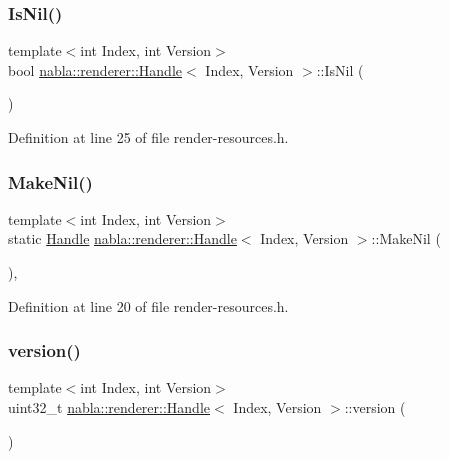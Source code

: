 \subsubsection{\texorpdfstring{IsNil()}{IsNil()}}
{\footnotesize\ttfamily template$<$int Index, int Version$>$ \\
bool \mbox{\hyperlink{classnabla_1_1renderer_1_1_handle}{nabla\+::renderer\+::\+Handle}}$<$ Index, Version $>$\+::Is\+Nil (\begin{DoxyParamCaption}{ }\end{DoxyParamCaption})\hspace{0.3cm}{\ttfamily [inline]}}



Definition at line 25 of file render-\/resources.\+h.

\mbox{\label{classnabla_1_1renderer_1_1_handle_a431d40c431625c3001b95485bcfafc97}} 
\subsubsection{\texorpdfstring{MakeNil()}{MakeNil()}}
{\footnotesize\ttfamily template$<$int Index, int Version$>$ \\
static \mbox{\hyperlink{classnabla_1_1renderer_1_1_handle}{Handle}} \mbox{\hyperlink{classnabla_1_1renderer_1_1_handle}{nabla\+::renderer\+::\+Handle}}$<$ Index, Version $>$\+::Make\+Nil (\begin{DoxyParamCaption}{ }\end{DoxyParamCaption})\hspace{0.3cm}{\ttfamily [inline]}, {\ttfamily [static]}}



Definition at line 20 of file render-\/resources.\+h.

\mbox{\label{classnabla_1_1renderer_1_1_handle_a5168abd8dec2822bb1720b2e65e884b2}} 
\subsubsection{\texorpdfstring{version()}{version()}}
{\footnotesize\ttfamily template$<$int Index, int Version$>$ \\
uint32\+\_\+t \mbox{\hyperlink{classnabla_1_1renderer_1_1_handle}{nabla\+::renderer\+::\+Handle}}$<$ Index, Version $>$\+::version (\begin{DoxyParamCaption}{ }\end{DoxyParamCaption})\hspace{0.3cm}{\ttfamily [inline]}}



